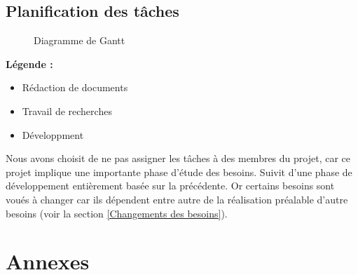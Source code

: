 \documentclass[french]{article}
\begin{document}
\newpage
\begin{landscape}
    \section{Planification des tâches}
    \begin{figure}[H]
        \centering
        \caption{Diagramme de Gantt}
        \label{fig:gantt}
    \end{figure}
    \textbf{Légende :}
    \\
    \begin{itemize}
        \item[] \colorbox{ganttBlue}{\color{ganttBlue}{ - }} Rédaction de documents
        \\
        \item[] \colorbox{ganttGreen}{\color{ganttGreen}{ - }} Travail de recherches
        \\
        \item[] \colorbox{ganttOrange}{\color{ganttOrange}{ - }} Développment
    \end{itemize}
    \bigskip
    \hspace{\parindent} Nous avons choisit de ne pas assigner les tâches à des membres du projet, car ce projet implique une importante phase d'étude des besoins. Suivit d'une phase de développement entièrement basée sur la précédente. Or certains besoins sont voués à changer car ils dépendent entre autre de la réalisation préalable d'autre besoins (voir la section \ref{Changements des besoins}).
\end{landscape}

\printbibliography

\section{Annexes}
\end{document}
